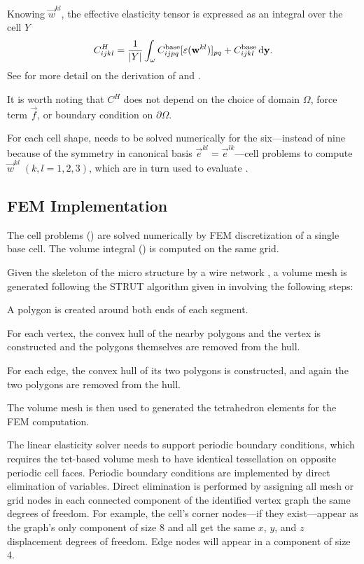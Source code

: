 \documentclass[twocolumn,10pt]{article}
\begin{document}
Knowing $\vec{w}^{kl}$, the effective elasticity tensor is expressed
as an integral over the cell $Y$
\begin{equation}
  \label{eqn:effective}
  C^H_{ijkl} = \frac{1}{|Y|} \int_\omega C_{ijpq}^\text{base}[\varepsilon(\mathbf w^{kl})]_{pq} + C_{ijkl}^\text{base} \, \mathrm{d} \mathbf y.
\end{equation}
See  for more detail on the derivation of
 and .

It is worth noting that $C^H$ does not depend on the choice of domain
$\Omega$, force term $\vec{f}$, or boundary condition on $\partial
\Omega$.

For each cell shape,  needs to be solved numerically for
the six---instead of nine because of the symmetry in canonical basis
$\vec{e}^{kl} = \vec{e}^{lk}$---cell problems to compute
$\vec{w}^{kl}\;(k,l=1,2,3)$, which are in turn used to evaluate
.

\subsection{FEM Implementation}
The cell problems () are solved numerically by FEM
discretization of a single base cell. The volume integral
() is computed on the same grid.

Given the skeleton of the micro structure by a wire network
, a volume mesh is generated following the STRUT
algorithm given in \cite{hart2008sculptural} involving the following
steps:\begin{inparaenum}[(i)]
\item A polygon is created around both ends of each segment.
\item For each vertex, the convex hull of the nearby polygons and the
  vertex is constructed and the polygons themselves are removed from
  the hull.
\item For each edge, the convex hull of its two polygons is
  constructed, and again the two polygons are removed from the hull.
\end{inparaenum}
The volume mesh is then used to generated the tetrahedron elements for
the FEM computation.

The linear elasticity solver needs to support periodic boundary
conditions, which requires the tet-based volume mesh to have identical
tessellation on opposite periodic cell faces. Periodic boundary
conditions are implemented by direct elimination of variables. Direct
elimination is performed by assigning all mesh or grid nodes in each
connected component of the identified vertex graph the same degrees of
freedom. For example, the cell's corner nodes---if they exist---appear
as the graph's only component of size 8 and all get the same $x$, $y$,
and $z$ displacement degrees of freedom. Edge nodes will appear in a
component of size 4.
\end{document}
